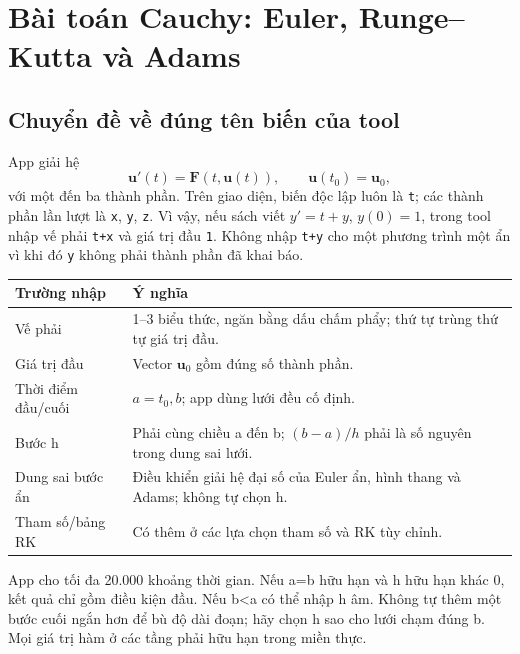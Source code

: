\chapter{Bài toán Cauchy: Euler, Runge--Kutta và Adams}
\label{ch:ode}


\section{Chuyển đề về đúng tên biến của tool}
App giải hệ
\[
\mathbf u'(t)=\mathbf F(t,\mathbf u(t)),\qquad
\mathbf u(t_0)=\mathbf u_0,
\]
với một đến ba thành phần. Trên giao diện, biến độc lập luôn là \texttt{t}; các thành phần lần lượt là \texttt{x}, \texttt{y}, \texttt{z}. Vì vậy, nếu sách viết $y'=t+y$, $y(0)=1$, trong tool nhập vế phải \texttt{t+x} và giá trị đầu \texttt{1}. Không nhập \texttt{t+y} cho một phương trình một ẩn vì khi đó \texttt{y} không phải thành phần đã khai báo.

\begin{center}\begin{tabular}{p{}p{}}
\toprule Trường nhập&Ý nghĩa\\\midrule
Vế phải&1--3 biểu thức, ngăn bằng dấu chấm phẩy; thứ tự trùng thứ tự giá trị đầu.\\
Giá trị đầu&Vector $\mathbf u_0$ gồm đúng số thành phần.\\
Thời điểm đầu/cuối&$a=t_0,b$; app dùng lưới đều cố định.\\
Bước h&Phải cùng chiều a đến b; $(b-a)/h$ phải là số nguyên trong dung sai lưới.\\
Dung sai bước ẩn&Điều khiển giải hệ đại số của Euler ẩn, hình thang và Adams; không tự chọn h.\\
Tham số/bảng RK&Có thêm ở các lựa chọn tham số và RK tùy chỉnh.\\\bottomrule
\end{tabular}\end{center}

App cho tối đa 20.000 khoảng thời gian. Nếu a=b hữu hạn và h hữu hạn khác 0, kết quả chỉ gồm điều kiện đầu. Nếu b<a có thể nhập h âm. Không tự thêm một bước cuối ngắn hơn để bù độ dài đoạn; hãy chọn h sao cho lưới chạm đúng b. Mọi giá trị hàm ở các tầng phải hữu hạn trong miền thực.

